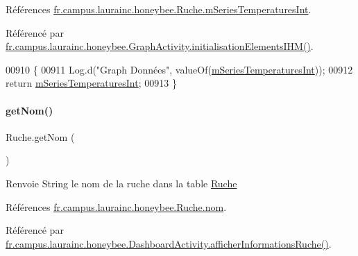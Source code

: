 Références \hyperlink{classfr_1_1campus_1_1laurainc_1_1honeybee_1_1_ruche_a0fe6febbc698e5c0ed34783a9cbb7719}{fr.\+campus.\+laurainc.\+honeybee.\+Ruche.\+m\+Series\+Temperatures\+Int}.



Référencé par \hyperlink{classfr_1_1campus_1_1laurainc_1_1honeybee_1_1_graph_activity_a7000895983725c6f795f7c73c1fafd20}{fr.\+campus.\+laurainc.\+honeybee.\+Graph\+Activity.\+initialisation\+Elements\+I\+H\+M()}.


\begin{DoxyCode}
00910                                                                   \{
00911         Log.d(\textcolor{stringliteral}{"Graph Données"}, valueOf(\hyperlink{classfr_1_1campus_1_1laurainc_1_1honeybee_1_1_ruche_a0fe6febbc698e5c0ed34783a9cbb7719}{mSeriesTemperaturesInt}));
00912         \textcolor{keywordflow}{return} \hyperlink{classfr_1_1campus_1_1laurainc_1_1honeybee_1_1_ruche_a0fe6febbc698e5c0ed34783a9cbb7719}{mSeriesTemperaturesInt};
00913     \}
\end{DoxyCode}
\mbox{\label{classfr_1_1campus_1_1laurainc_1_1honeybee_1_1_ruche_a0db4200faed3952a50f63fa7634be39b}} 
\paragraph{\texorpdfstring{get\+Nom()}{getNom()}}
{\footnotesize\ttfamily Ruche.\+get\+Nom (\begin{DoxyParamCaption}{ }\end{DoxyParamCaption})}

\begin{DoxyReturn}{Renvoie}
String le nom de la ruche dans la table \hyperlink{classfr_1_1campus_1_1laurainc_1_1honeybee_1_1_ruche}{Ruche} 
\end{DoxyReturn}


Références \hyperlink{classfr_1_1campus_1_1laurainc_1_1honeybee_1_1_ruche_ae18dd003de10a89841422fd96b1139d7}{fr.\+campus.\+laurainc.\+honeybee.\+Ruche.\+nom}.



Référencé par \hyperlink{classfr_1_1campus_1_1laurainc_1_1honeybee_1_1_dashboard_activity_a88f00531bee33bd6c47b33f5ac4df9ed}{fr.\+campus.\+laurainc.\+honeybee.\+Dashboard\+Activity.\+afficher\+Informations\+Ruche()}.


